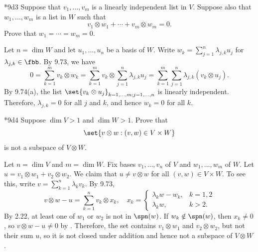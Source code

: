 \begin{exercise}*{9d3}
    Suppose that $v_1, \ldots, v_m$ is a linearly independent list in $V$.
    Suppose also that $w_1, \ldots, w_m$ is a list in $W$ such that
    \[
        v_1 \otimes w_1 + \cdots + v_m \otimes w_m = 0.
    \]
    Prove that $w_1 = \cdots = w_m = 0$.
\end{exercise}

\begin{sol}
    Let $n = \dim W$ and let $u_1, \ldots, u_n$ be a basis of $W$.
    Write $w_k = \sum_{j=1}^n \lambda_{j, k} u_j$ for $\lambda_{j, k} \in \fbb$.
    By 9.73, we have
    \[
        0 = \sum_{k=1}^m v_k \otimes w_k = \sum_{k=1}^m v_k \otimes \sum_{j=1}^n \lambda_{j, k} u_j = \sum_{k=1}^m \sum_{j=1}^n \lambda_{j, k} (v_k \otimes u_j).
    \]
    By 9.74(a), the list $\set{v_k \otimes u_j}_{k=1, \ldots, m; j=1, \ldots, n}$ is linearly independent.
    Therefore, $\lambda_{j, k} = 0$ for all $j$ and $k$, and hence $w_k = 0$ for all $k$.
\end{sol}

\begin{exercise}*{9d4}
    Suppose $\dim V > 1$ and $\dim W > 1$.
    Prove that
    \[
        \set{v \otimes w : (v, w) \in V \times W}
    \]
    is not a subspace of $V \otimes W$.

\end{exercise}

\begin{sol}
    Let $n = \dim V$ and $m = \dim W$.
    Fix bases $v_1, \ldots, v_n$ of $V$ and $w_1, \ldots, w_m$ of $W$.
    Let $u = v_1 \otimes w_1 + v_2 \otimes w_2$.
    We claim that $u \neq v \otimes w$ for all $(v, w) \in V \times W$.
    To see this, write $v = \sum_{k=1}^n \lambda_k v_k$.
    By 9.73,
    \[
        v \otimes w - u = \sum_{k=1}^n v_k \otimes x_k, \quad x_k = 
        \begin{cases}
            \lambda_k w - w_k, & k = 1, 2 \\
            \lambda_k w, & k > 2.
        \end{cases}
    \]
    By 2.22, at least one of $w_1$ or $w_2$ is not in $\spn(w)$.
    If $w_k \notin \spn(w)$, then $x_k \neq 0$, so $v \otimes w - u \neq 0$ by .
    Therefore, the set contains $v_1 \otimes w_1$ and $v_2 \otimes w_2$, but not their sum $u$, so it is not closed under addition and hence not a subspace of $V \otimes W$.
\end{sol}

